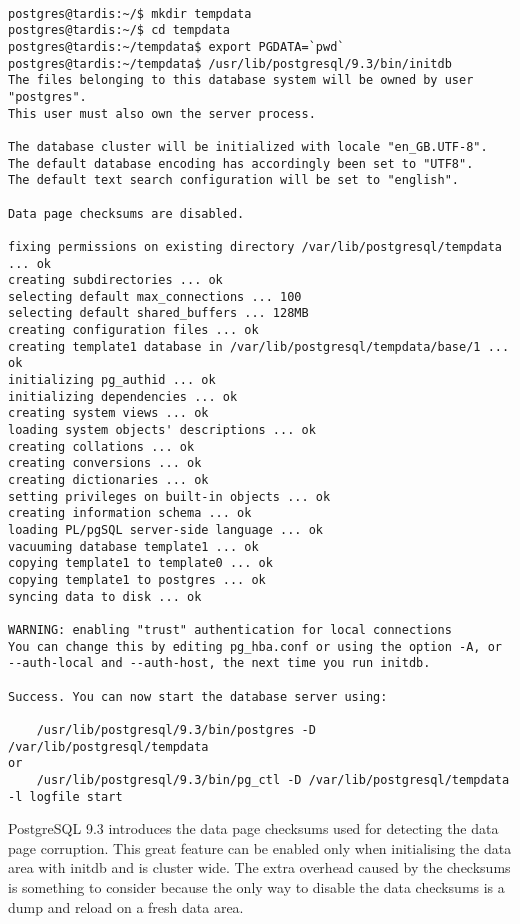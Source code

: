 \begin{verbatim}

postgres@tardis:~/$ mkdir tempdata
postgres@tardis:~/$ cd tempdata
postgres@tardis:~/tempdata$ export PGDATA=`pwd`
postgres@tardis:~/tempdata$ /usr/lib/postgresql/9.3/bin/initdb
The files belonging to this database system will be owned by user "postgres".
This user must also own the server process.

The database cluster will be initialized with locale "en_GB.UTF-8".
The default database encoding has accordingly been set to "UTF8".
The default text search configuration will be set to "english".

Data page checksums are disabled.

fixing permissions on existing directory /var/lib/postgresql/tempdata ... ok
creating subdirectories ... ok
selecting default max_connections ... 100
selecting default shared_buffers ... 128MB
creating configuration files ... ok
creating template1 database in /var/lib/postgresql/tempdata/base/1 ... ok
initializing pg_authid ... ok
initializing dependencies ... ok
creating system views ... ok
loading system objects' descriptions ... ok
creating collations ... ok
creating conversions ... ok
creating dictionaries ... ok
setting privileges on built-in objects ... ok
creating information schema ... ok
loading PL/pgSQL server-side language ... ok
vacuuming database template1 ... ok
copying template1 to template0 ... ok
copying template1 to postgres ... ok
syncing data to disk ... ok

WARNING: enabling "trust" authentication for local connections
You can change this by editing pg_hba.conf or using the option -A, or
--auth-local and --auth-host, the next time you run initdb.

Success. You can now start the database server using:

    /usr/lib/postgresql/9.3/bin/postgres -D /var/lib/postgresql/tempdata
or
    /usr/lib/postgresql/9.3/bin/pg_ctl -D /var/lib/postgresql/tempdata -l logfile start

\end{verbatim}

PostgreSQL 9.3 introduces the data page checksums used for detecting the data page corruption.
This great feature can be enabled only when initialising the data area with
initdb and is cluster wide. The extra overhead caused by the checksums is
something to consider because the only way to disable the data checksums is a
dump and reload on a fresh data area.\newline

